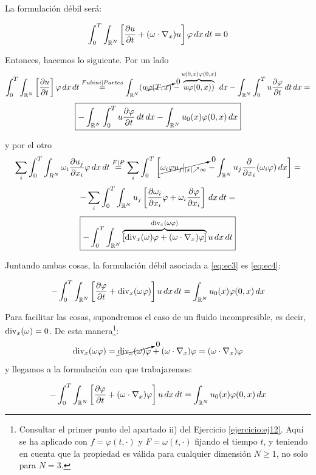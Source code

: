 La formulación débil será:

$$\int_0^T \int_{\mathbb{R}^N} \left[ \dfrac{\partial u}{\partial t} + (\omega \cdot \nabla_x) u \right] \varphi\,dx\,dt = 0$$

Entonces, hacemos lo siguiente. Por un lado
$$\int_0^T \int_{\mathbb{R}^N} \left[ \dfrac{\partial u}{\partial t} \right] \varphi\,dx\,dt \stackrel{Fubini | Partes}{=} 
\int_{\mathbb{R}^N} (u \cancelto{0}{\varphi(T,x)} - \overbrace{u \varphi(0,x))}^{u(0,x)\varphi(0,x)} \,dx - \int_{\mathbb{R}^N} \int_{0}^{T} u \dfrac{\partial \varphi}{\partial t} \,dt\,dx = $$
$$\boxed{- \int_{\mathbb{R}^N} \int_{0}^{T} u \dfrac{\partial \varphi}{\partial t} \,dt\,dx - \int_{\mathbb{R}^N}u_0(x) \varphi(0,x)\,dx}$$

y por el otro
$$\sum_i \int_{0}^{T} \int_{R^N} \omega_i \dfrac{\partial u_j}{\partial x_i} \varphi \,dx\,dt \stackrel{F|P}{=} 
\sum_i \int_{0}^{T} \left[ \cancelto{0}{\omega_i \varphi u_j |_{|x| \nearrow \infty}} - \int_{\mathbb{R}^N} u_j \dfrac{\partial}{\partial x_i} (\omega_i \varphi) \,dx\right] = $$
$$- \sum_i \int_{0}^{T} \int_{\mathbb{R}^N} u_j \left[ \dfrac{\partial \omega_i}{\partial x_i} \varphi + \omega_i \dfrac{\partial \varphi}{\partial x_i} \right] \,dx\,dt = $$
$$\boxed{- \int_{0}^{T} \int_{\mathbb{R}^N} \overbrace{\left[ \text{div}_x(\omega) \varphi + (\omega \cdot \nabla_x) \varphi \right]}^{\text{div}_x(\omega \varphi)} u \,dx\,dt}$$

Juntando ambas cosas, la formulación débil asociada a \eqref{eq:ec3} es \eqref{eq:ec4}:

\begin{definicion}
    \begin{equation}\label{eq:ec4}
        - \int_{0}^{T} \int_{\mathbb{R}^N} \left[ \dfrac{\partial \varphi}{\partial t} + \text{div}_x(\omega \varphi) \right] u \,dx\,dt = \int_{\mathbb{R}^N} u_0(x) \varphi(0,x)\,dx
    \end{equation}
\end{definicion}

Para facilitar las cosas, supondremos el caso de un fluido incompresible, es decir, $\text{div}_x(\omega) = 0$. De esta manera\footnote{Consultar el primer punto del apartado ii) del Ejercicio \ref{ejercicio:ej12}. Aquí se ha aplicado con $f = \varphi(t, \cdot)$ y $F = \omega(t, \cdot)$
fijando el tiempo $t$, y teniendo en cuenta que la propiedad es válida para cualquier dimensión $N \geq 1$, no solo para $N = 3$.}:
$$\text{div}_x(\omega \varphi) = \cancelto{0}{\text{div}_x(\omega) \varphi} + (\omega \cdot \nabla_x) \varphi = (\omega \cdot \nabla_x) \varphi$$
y llegamos a la formulación con que trabajaremos:
\begin{definicion}
    \begin{equation}\label{eq:ec5}
        - \int_{0}^{T} \int_{\mathbb{R}^N} \left[ \dfrac{\partial \varphi}{\partial t} + (\omega \cdot \nabla_x) \varphi \right] u \,dx\,dt = \int_{\mathbb{R}^N} u_0(x) \varphi(0,x)\,dx
    \end{equation}
\end{definicion}

